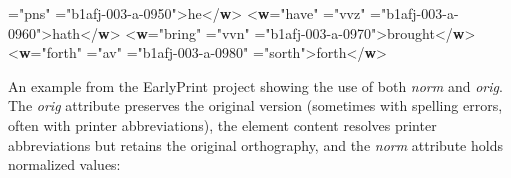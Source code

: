 \begin{reflist}
\begin{sansreflist}
\begin{reflist}
{\hspace*{1em}{pos}="{pns}"\mbox{}\newline 
\hspace*{1em}{xml:id}="{b1afj-003-a-0950}">}he{</\textbf{w}>}\mbox{}\newline 
{<\textbf{w}\hspace*{1em}{lemma}="{have}"\mbox{}\newline 
\hspace*{1em}{pos}="{vvz}"\mbox{}\newline 
\hspace*{1em}{xml:id}="{b1afj-003-a-0960}">}hath{</\textbf{w}>}\mbox{}\newline 
{<\textbf{w}\hspace*{1em}{lemma}="{bring}"\mbox{}\newline 
\hspace*{1em}{pos}="{vvn}"\mbox{}\newline 
\hspace*{1em}{xml:id}="{b1afj-003-a-0970}">}brought{</\textbf{w}>}\mbox{}\newline 
{<\textbf{w}\hspace*{1em}{lemma}="{forth}"\mbox{}\newline 
\hspace*{1em}{pos}="{av}"\mbox{}\newline 
\hspace*{1em}{xml:id}="{b1afj-003-a-0980}"\mbox{}\newline 
\hspace*{1em}{orig}="{sorth}">}forth{</\textbf{w}>}
    \item[]An example from the EarlyPrint project showing the use of both {\itshape norm} and {\itshape orig}. The {\itshape orig} attribute preserves the original version (sometimes with spelling errors, often with printer abbreviations), the element content resolves printer abbreviations but retains the original orthography, and the {\itshape norm} attribute holds normalized values:
\end{reflist}
\end{sansreflist}
\end{reflist}
